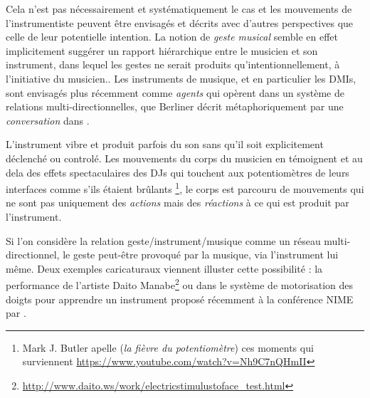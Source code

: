 Cela n'est pas nécessairement et systématiquement le cas et les mouvements de l'instrumentiste peuvent être envisagés et décrits avec d'autres perspectives que celle de leur potentielle intention.  La notion de \textit{geste musical} semble en effet implicitement suggérer un rapport hiérarchique entre le musicien et son instrument, dans lequel les gestes ne serait produits qu'intentionnellement, à l'initiative du musicien.. Les instruments de musique, et en particulier les DMIs, sont envisagés plus récemment comme \textit{agents} qui opèrent dans un système de relations multi-directionnelles, que Berliner décrit métaphoriquement par une \textit{conversation} dans \cite{berliner_thinking_2009}.  


L'instrument vibre et produit parfois du son sans qu'il soit explicitement déclenché ou controlé. Les mouvements du corps du musicien en témoignent et au dela des effets spectaculaires des DJs qui touchent aux potentiomètres de leurs interfaces comme s'ils étaient brûlants \footnote{Mark J. Butler apelle  (\textit{la fièvre du potentiomètre}) ces moments qui surviennent  \cite{butler_playing_2014} \url{https://www.youtube.com/watch?v=Nh9C7nQHmII}}, le corps est parcouru de mouvements qui ne sont pas uniquement des \textit{actions} mais des \textit{réactions} à ce qui est produit par l'instrument. 


Si l'on considère la relation geste/instrument/musique comme un réseau multi-directionnel, le geste peut-être provoqué par la musique, via l'instrument lui même. Deux exemples caricaturaux viennent illuster cette possibilité : la performance  de l'artiste Daito Manabe\footnote{\url{http://www.daito.ws/work/electricstimulustoface_test.html}} ou dans le système de motorisation des doigts pour apprendre un instrument proposé récemment à la conférence NIME par \cite{zhang_adaptive_2019}.


